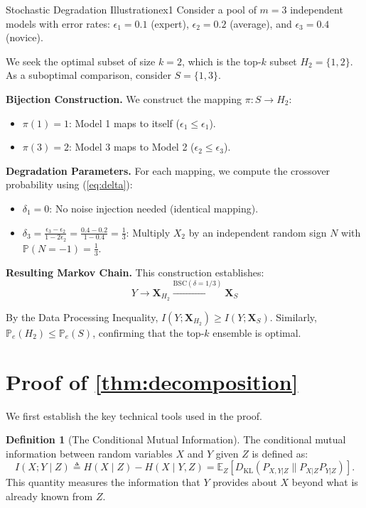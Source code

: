 \documentclass{article}
\theoremstyle{plain}
\theoremstyle{definition}
\newtheorem{definition}[theorem]{Definition}
\theoremstyle{remark}
\begin{document}
\begin{example}{Stochastic Degradation Illustration}{ex1}
Consider a pool of $m=3$ independent models with error rates: $\epsilon_1=0.1$ (expert), $\epsilon_2=0.2$ (average), and $\epsilon_3=0.4$ (novice).  

We seek the optimal subset of size $k=2$, which is the top-$k$ subset $H_2=\{1,2\}$. As a suboptimal comparison, consider $S=\{1,3\}$. 

\noindent\textbf{Bijection Construction.} We construct the mapping $\pi: S \to H_2$:
\begin{itemize}
    \item $\pi(1) = 1$: Model 1 maps to itself ($\epsilon_1 \le \epsilon_1$).
    \item $\pi(3) = 2$: Model 3 maps to Model 2 ($\epsilon_2 \le \epsilon_3$).
\end{itemize}

\noindent\textbf{Degradation Parameters.} For each mapping, we compute the crossover probability using (\ref{eq:delta}):
\begin{itemize}
    \item $\delta_1 = 0$: No noise injection needed (identical mapping).
    \item $\delta_3 = \frac{\epsilon_3 - \epsilon_2}{1 - 2\epsilon_2} = \frac{0.4 - 0.2}{1 - 0.4} = \frac{1}{3}$: Multiply $X_2$ by an independent random sign $N$ with $\mathbb{P}(N = -1) = \frac{1}{3}$.
\end{itemize}

\noindent\textbf{Resulting Markov Chain.} This construction establishes:
\begin{equation*}
    Y \longrightarrow \mathbf{X}_{H_2} \xrightarrow{\text{BSC}(\delta=1/3)} \mathbf{X}_S
\end{equation*}

By the Data Processing Inequality, $I(Y; \mathbf{X}_{H_2}) \ge I(Y; \mathbf{X}_S)$. Similarly, $\mathbb{P}_e(H_2) \le \mathbb{P}_e(S)$, confirming that the top-$k$ ensemble is optimal.
\end{example}


\newpage
\section{Proof of \cref{thm:decomposition}} \label{Proof_of_Thm_4_3}

We first establish the key technical tools used in the proof.

\begin{definition}[The Conditional Mutual Information]
\label{def:cond_mi}
The conditional mutual information between random variables $X$ and $Y$ given $Z$ is defined as:
\begin{equation}
    I(X; Y \mid Z) \triangleq H(X \mid Z) - H(X \mid Y, Z) = \mathbb{E}_Z \left[ D_{\mathrm{KL}}(P_{X,Y|Z} \| P_{X|Z} P_{Y|Z}) \right].
\end{equation}
This quantity measures the information that $Y$ provides about $X$ beyond what is already known from $Z$.
\end{definition}
\end{document}
